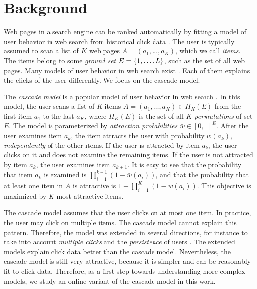 
\section{Background}
\label{sec:background}

Web pages in a search engine can be ranked automatically by fitting a model of user behavior in web search from historical click data \cite{radlinski05query,agichtein06improving}. The user is typically assumed to scan a list of $K$ web pages $A = (a_1, \dots, a_K)$, which we call \emph{items}. The items belong to some \emph{ground set} $E = \left\{1, \dots, L\right\}$, such as the set of all web pages. Many models of user behavior in web search exist \cite{becker07modeling,craswell08experimental,richardson07predicting}. Each of them explains the clicks of the user differently. We focus on the cascade model.

The \emph{cascade model} is a popular model of user behavior in web search \cite{craswell08experimental}. In this model, the user scans a list of $K$ items $A = (a_1, \dots, a_K) \in \Pi_K(E)$ from the first item $a_1$ to the last $a_K$, where $\Pi_K(E)$ is the set of all \emph{$K$-permutations} of set $E$. The model is parameterized by \emph{attraction probabilities} $\bar{w} \in [0, 1]^E$. After the user examines item $a_k$, the item attracts the user with probability $\bar{w}(a_k)$, \emph{independently} of the other items. If the user is attracted by item $a_k$, the user clicks on it and does not examine the remaining items. If the user is not attracted by item $a_k$, the user examines item $a_{k + 1}$. It is easy to see that the probability that item $a_k$ is examined is $\prod_{i = 1}^{k - 1} (1 - \bar{w}(a_i))$, and that the probability that at least one item in $A$ is attractive is $1 - \prod_{i = 1}^{K} (1 - \bar{w}({a_i}))$. This objective is maximized by $K$ most attractive items.

The cascade model assumes that the user clicks on at most one item. In practice, the user may click on multiple items. The cascade model cannot explain this pattern. Therefore, the model was extended in several directions, for instance to take into account \emph{multiple clicks} and the \emph{persistence} of users \cite{chapelle09dynamic,guo09click,guo09efficient}. The extended models explain click data better than the cascade model. Nevertheless, the cascade model is still very attractive, because it is simpler and can be reasonably fit to click data. Therefore, as a first step towards understanding more complex models, we study an online variant of the cascade model in this work.
